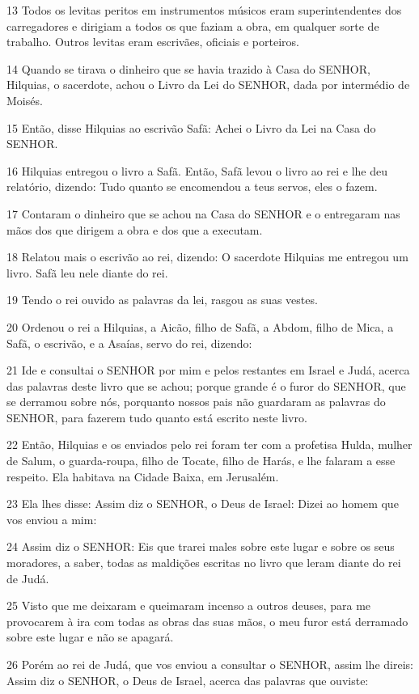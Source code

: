 \par 13 Todos os levitas peritos em instrumentos músicos eram superintendentes dos carregadores e dirigiam a todos os que faziam a obra, em qualquer sorte de trabalho. Outros levitas eram escrivães, oficiais e porteiros.
\par 14 Quando se tirava o dinheiro que se havia trazido à Casa do SENHOR, Hilquias, o sacerdote, achou o Livro da Lei do SENHOR, dada por intermédio de Moisés.
\par 15 Então, disse Hilquias ao escrivão Safã: Achei o Livro da Lei na Casa do SENHOR.
\par 16 Hilquias entregou o livro a Safã. Então, Safã levou o livro ao rei e lhe deu relatório, dizendo: Tudo quanto se encomendou a teus servos, eles o fazem.
\par 17 Contaram o dinheiro que se achou na Casa do SENHOR e o entregaram nas mãos dos que dirigem a obra e dos que a executam.
\par 18 Relatou mais o escrivão ao rei, dizendo: O sacerdote Hilquias me entregou um livro. Safã leu nele diante do rei.
\par 19 Tendo o rei ouvido as palavras da lei, rasgou as suas vestes.
\par 20 Ordenou o rei a Hilquias, a Aicão, filho de Safã, a Abdom, filho de Mica, a Safã, o escrivão, e a Asaías, servo do rei, dizendo:
\par 21 Ide e consultai o SENHOR por mim e pelos restantes em Israel e Judá, acerca das palavras deste livro que se achou; porque grande é o furor do SENHOR, que se derramou sobre nós, porquanto nossos pais não guardaram as palavras do SENHOR, para fazerem tudo quanto está escrito neste livro.
\par 22 Então, Hilquias e os enviados pelo rei foram ter com a profetisa Hulda, mulher de Salum, o guarda-roupa, filho de Tocate, filho de Harás, e lhe falaram a esse respeito. Ela habitava na Cidade Baixa, em Jerusalém.
\par 23 Ela lhes disse: Assim diz o SENHOR, o Deus de Israel: Dizei ao homem que vos enviou a mim:
\par 24 Assim diz o SENHOR: Eis que trarei males sobre este lugar e sobre os seus moradores, a saber, todas as maldições escritas no livro que leram diante do rei de Judá.
\par 25 Visto que me deixaram e queimaram incenso a outros deuses, para me provocarem à ira com todas as obras das suas mãos, o meu furor está derramado sobre este lugar e não se apagará.
\par 26 Porém ao rei de Judá, que vos enviou a consultar o SENHOR, assim lhe direis: Assim diz o SENHOR, o Deus de Israel, acerca das palavras que ouviste:
